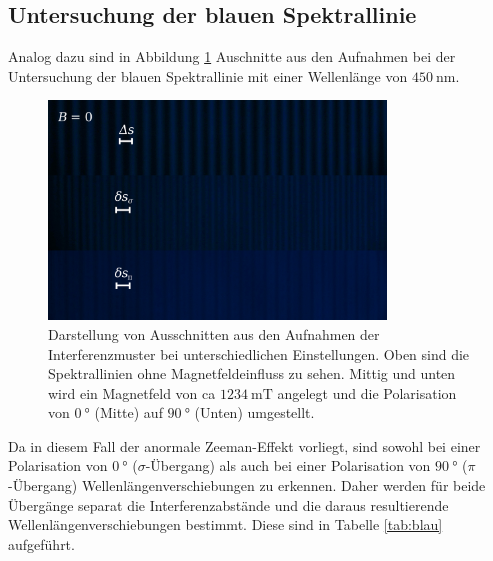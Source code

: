  \subsection{Untersuchung der blauen Spektrallinie}
 Analog dazu sind in Abbildung \ref{fig:blau} Auschnitte aus den Aufnahmen bei der Untersuchung der blauen
 Spektrallinie mit einer Wellenlänge von $\SI{450}{\nano\meter}$.
 \begin{figure}[H]
     \centering
     \includegraphics[width=0.8\textwidth]{images/zebraplot_blau.jpg}
     \caption{Darstellung von Ausschnitten aus den Aufnahmen der Interferenzmuster bei unterschiedlichen
     Einstellungen. Oben sind die Spektrallinien ohne Magnetfeldeinfluss zu sehen. Mittig und unten
     wird ein Magnetfeld von ca $\SI{1234}{\milli\tesla}$ angelegt und die Polarisation von $\SI{0}{\degree}$ (Mitte)
     auf $\SI{90}{\degree}$ (Unten) umgestellt.}
     \label{fig:blau}
 \end{figure} \noindent
 Da in diesem Fall der anormale Zeeman-Effekt vorliegt, sind sowohl bei einer Polarisation von
 $\SI{0}{\degree}$ ($\sigma$-Übergang) als auch bei einer Polarisation von $\SI{90}{\degree}$ ($\pi$-Übergang)
 Wellenlängenverschiebungen zu erkennen. Daher werden für beide Übergänge separat die Interferenzabstände
 und die daraus resultierende Wellenlängenverschiebungen bestimmt. Diese sind in Tabelle \ref{tab:blau}
 aufgeführt.
